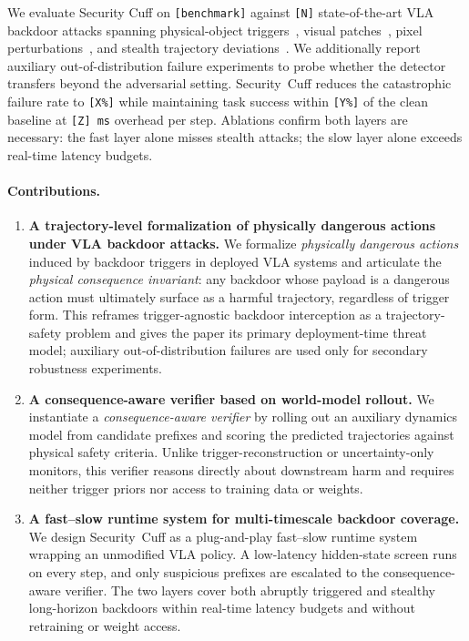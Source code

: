 We evaluate Security Cuff on \texttt{[benchmark]} against
\verb|[N]| state-of-the-art VLA backdoor attacks spanning
physical-object triggers~\citep{goba}, visual
patches~\citep{tabvla}, pixel
perturbations~\citep{badvla}, and stealth trajectory
deviations~\citep{silentdrift}.
We additionally report auxiliary out-of-distribution failure
experiments to probe whether the detector transfers beyond the
adversarial setting.
Security~Cuff reduces the catastrophic failure rate to
\verb|[X%]| while maintaining task success within
\verb|[Y%]| of the clean baseline at \verb|[Z] ms|
overhead per step.
Ablations confirm both layers are necessary: the fast layer alone
misses stealth attacks; the slow layer alone exceeds real-time
latency budgets.

\paragraph{Contributions.}
\begin{enumerate}
\item \textbf{A trajectory-level formalization of physically
dangerous actions under VLA backdoor attacks.}
We formalize \emph{physically dangerous actions} induced by
backdoor triggers in deployed VLA systems and articulate the
\emph{physical consequence invariant}: any backdoor whose payload
is a dangerous action must ultimately surface as a harmful
trajectory, regardless of trigger form. This reframes
trigger-agnostic backdoor interception as a trajectory-safety
problem and gives the paper its primary deployment-time threat
model; auxiliary out-of-distribution failures are used only for
secondary robustness experiments.

\item \textbf{A consequence-aware verifier based on world-model
rollout.}
We instantiate a \emph{consequence-aware verifier} by rolling out
an auxiliary dynamics model from candidate prefixes and scoring the
predicted trajectories against physical safety criteria. Unlike
trigger-reconstruction or uncertainty-only monitors, this verifier
reasons directly about downstream harm and requires neither trigger
priors nor access to training data or weights.

\item \textbf{A fast--slow runtime system for multi-timescale
backdoor coverage.}
We design Security~Cuff as a plug-and-play fast--slow runtime
system wrapping an unmodified VLA policy. A low-latency hidden-state
screen runs on every step, and only suspicious prefixes are
escalated to the consequence-aware verifier. The two layers cover
both abruptly triggered and stealthy long-horizon backdoors within
real-time latency budgets and without retraining or weight access.
\end{enumerate}
